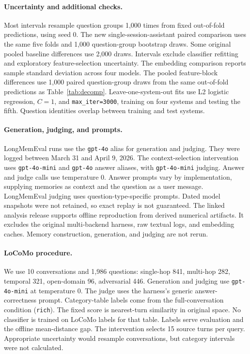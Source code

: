 \documentclass{article}
\begin{document}
\paragraph{Uncertainty and additional checks.}
Most intervals resample question groups 1{,}000 times from fixed out-of-fold
predictions, using seed 0.
The new single-session-assistant paired comparison uses the same five folds
and 1{,}000 question-group bootstrap draws.
Some original pooled baseline differences use 2{,}000 draws.
Intervals exclude classifier refitting and exploratory feature-selection uncertainty.
The embedding comparison reports sample standard deviation across four models.
The pooled feature-block differences use 1{,}000 paired question-group draws
from the same out-of-fold predictions as Table~\ref{tab:decomp}.
Leave-one-system-out fits use L2 logistic regression, $C=1$,
and \texttt{max\_iter=3000}, training on four systems and testing the fifth.
Question identities overlap between training and test systems.

\paragraph{Generation, judging, and prompts.}
LongMemEval runs use the \texttt{gpt-4o} alias for generation and judging.
They were logged between March 31 and April 9, 2026.
The context-selection intervention uses \texttt{gpt-4o-mini} and
\texttt{gpt-4o} answer aliases, with \texttt{gpt-4o-mini} judging.
Answer and judge calls use temperature 0.
Answer prompts vary by implementation, supplying memories as context
and the question as a user message.
LongMemEval judging uses question-type-specific prompts.
Dated model snapshots were not retained, so exact replay is not guaranteed.
The linked analysis release supports offline reproduction from derived numerical
artifacts. It excludes the original multi-backend harness, raw textual logs, and
embedding caches. Memory construction, generation, and judging are not rerun.

\paragraph{LoCoMo procedure.}
We use 10 conversations and 1{,}986 questions:
single-hop 841, multi-hop 282, temporal 321, open-domain 96, adversarial 446.
Generation and judging use \texttt{gpt-4o-mini} at temperature 0.
The judge uses the harness's generic answer-correctness prompt.
Category-table labels come from the full-conversation condition
(\texttt{rich}). The fixed score is nearest-turn similarity in original space.
No classifier is trained on LoCoMo labels for that table.
Labels serve evaluation and the offline mean-distance gap.
The intervention selects 15 source turns per query.
Appropriate uncertainty would resample conversations, but category
intervals were not calculated.
\end{document}
